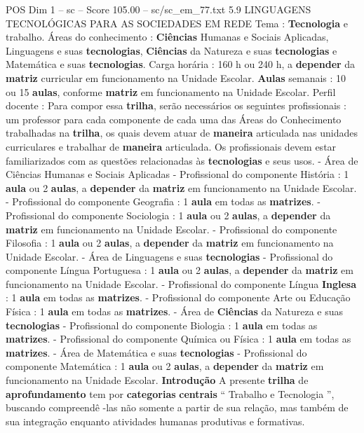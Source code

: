 \begin{textsample}{POS Dim 1 – sc – Score 105.00 – sc/sc\_em\_77.txt}  \label{ex:f1_pos_001}
5.9 LINGUAGENS TECNOLÓGICAS PARA AS SOCIEDADES EM REDE Tema : \textbf{Tecnologia} e trabalho.
Áreas do conhecimento : \textbf{Ciências} Humanas e Sociais Aplicadas, Linguagens e suas \textbf{tecnologias}, \textbf{Ciências} da Natureza e suas \textbf{tecnologias} e Matemática e suas \textbf{tecnologias}.
Carga horária : 160 h ou 240 h, a \textbf{depender} da \textbf{matriz} curricular em funcionamento na Unidade Escolar. \textbf{Aulas} semanais : 10 ou 15 \textbf{aulas}, conforme \textbf{matriz} em funcionamento na Unidade Escolar.
Perfil docente : Para compor essa \textbf{trilha}, serão necessários os seguintes profissionais : um professor para cada componente de cada uma das Áreas do Conhecimento trabalhadas na \textbf{trilha}, os quais devem atuar de \textbf{maneira} articulada nas unidades curriculares e trabalhar de \textbf{maneira} articulada.
Os profissionais devem estar familiarizados com as questões relacionadas às \textbf{tecnologias} e seus usos. - Área de Ciências Humanas e Sociais Aplicadas - Profissional do componente História : 1 \textbf{aula} ou 2 \textbf{aulas}, a \textbf{depender} da \textbf{matriz} em funcionamento na Unidade Escolar. - Profissional do componente Geografia : 1 \textbf{aula} em todas as \textbf{matrizes}. - Profissional do componente Sociologia : 1 \textbf{aula} ou 2 \textbf{aulas}, a \textbf{depender} da \textbf{matriz} em funcionamento na Unidade Escolar. - Profissional do componente Filosofia : 1 \textbf{aula} ou 2 \textbf{aulas}, a \textbf{depender} da \textbf{matriz} em funcionamento na Unidade Escolar. - Área de Linguagens e suas \textbf{tecnologias} - Profissional do componente Língua Portuguesa : 1 \textbf{aula} ou 2 \textbf{aulas}, a \textbf{depender} da \textbf{matriz} em funcionamento na Unidade Escolar. - Profissional do componente Língua \textbf{Inglesa} : 1 \textbf{aula} em todas as \textbf{matrizes}. - Profissional do componente Arte ou Educação Física : 1 \textbf{aula} em todas as \textbf{matrizes}. - Área de \textbf{Ciências} da Natureza e suas \textbf{tecnologias} - Profissional do componente Biologia : 1 \textbf{aula} em todas as \textbf{matrizes}. - Profissional do componente Química ou Física : 1 \textbf{aula} em todas as \textbf{matrizes}. - Área de Matemática e suas \textbf{tecnologias} - Profissional do componente Matemática : 1 \textbf{aula} ou 2 \textbf{aulas}, a \textbf{depender} da \textbf{matriz} em funcionamento na Unidade Escolar. \textbf{Introdução} A presente \textbf{trilha} de \textbf{aprofundamento} tem por \textbf{categorias} \textbf{centrais} “ Trabalho e Tecnologia ”, buscando compreendê -las não somente a partir de sua relação, mas também de sua integração enquanto atividades humanas produtivas e formativas.

\end{textsample}
